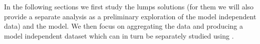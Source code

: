 In the following sections we first study the lumps solutions (for them we will also provide a separate \ml analysis as a preliminary exploration of the model independent data) and the \wzw model.
We then focus on aggregating the data and producing a model independent dataset which can in turn be separately studied using \ml.
